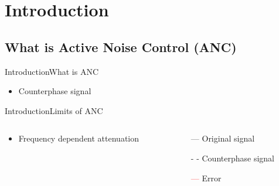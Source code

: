 \section{Introduction}
\subsection{What is Active Noise Control (ANC)}
\begin{frame}{Introduction}{What is ANC}		
	\begin{itemize}
		\item Counterphase signal
	\end{itemize}
\end{frame}





\begin{frame}{Introduction}{Limits of ANC}		


	\begin{columns}
		\begin{column}{0.5\textwidth}
				\begin{itemize}
					\item Frequency dependent attenuation	
				\end{itemize}
				\vspace{8.5mm}
		\begin{center}
	 		
	 	\end{center}
		\end{column}
		\begin{column}{0.5\textwidth} 
			\begin{itemize}
				\item[\textcolor{MATLABblue}{---}] Original signal
				\item[\textcolor{MATLABblue}{- -}] Counterphase signal
				\item[\textcolor{red}{---}] Error
			\end{itemize}
		\begin{center}
	 		
	 	\end{center}
		\end{column}
	\end{columns}
\end{frame}



